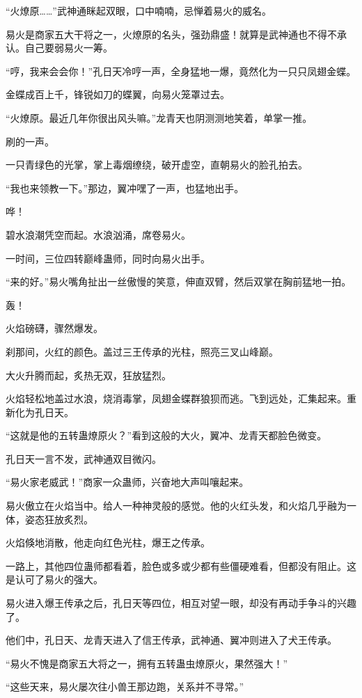 \begin{this_body}
“火燎原……”武神通眯起双眼，口中喃喃，忌惮着易火的威名。

易火是商家五大干将之一，火燎原的名头，强劲鼎盛！就算是武神通也不得不承认。自己要弱易火一筹。

“哼，我来会会你！”孔日天冷哼一声，全身猛地一爆，竟然化为一只只凤翅金蝶。

金蝶成百上千，锋锐如刀的蝶翼，向易火笼罩过去。

“火燎原。最近几年你很出风头嘛。”龙青天也阴测测地笑着，单掌一推。

刷的一声。

一只青绿色的光掌，掌上毒烟缭绕，破开虚空，直朝易火的脸孔拍去。

“我也来领教一下。”那边，翼冲嘿了一声，也猛地出手。

哗！

碧水浪潮凭空而起。水浪汹涌，席卷易火。

一时间，三位四转巅峰蛊师，同时向易火出手。

“来的好。”易火嘴角扯出一丝傲慢的笑意，伸直双臂，然后双掌在胸前猛地一拍。

轰！

火焰磅礴，骤然爆发。

刹那间，火红的颜色。盖过三王传承的光柱，照亮三叉山峰巅。

大火升腾而起，炙热无双，狂放猛烈。

火焰轻松地盖过水浪，烧消毒掌，凤翅金蝶群狼狈而逃。飞到远处，汇集起来。重新化为孔日天。

“这就是他的五转蛊燎原火？”看到这般的大火，翼冲、龙青天都脸色微变。

孔日天一言不发，武神通双目微闪。

“易火家老威武！”商家一众蛊师，兴奋地大声叫嚷起来。

易火傲立在火焰当中。给人一种神灵般的感觉。他的火红头发，和火焰几乎融为一体，姿态狂放炙烈。

火焰倏地消散，他走向红色光柱，爆王之传承。

一路上，其他四位蛊师都看着，脸色或多或少都有些僵硬难看，但都没有阻止。这是认可了易火的强大。

易火进入爆王传承之后，孔日天等四位，相互对望一眼，却没有再动手争斗的兴趣了。

他们中，孔日天、龙青天进入了信王传承，武神通、翼冲则进入了犬王传承。

“易火不愧是商家五大将之一，拥有五转蛊虫燎原火，果然强大！”

“这些天来，易火屡次往小兽王那边跑，关系并不寻常。”


\end{this_body}
